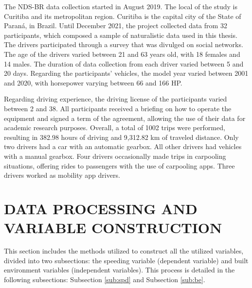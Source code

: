 The NDS-BR data collection started in August 2019. The local of the study is Curitiba and its metropolitan region. Curitiba is the capital city of the State of Paraná, in Brazil. Until December 2021, the project collected data from 32 participants, which composed a sample of naturalistic data used in this thesis. The drivers participated through a survey that was divulged on social networks. The age of the drivers varied between 21 and 63 years old, with 18 females and 14 males. The duration of data collection from each driver varied between 5 and 20 days. Regarding the participants' vehicles, the model year varied between 2001 and 2020, with horsepower varying between 66 and 166 HP. 

Regarding driving experience, the driving license of the participants varied between 2 and 38. All participants received a briefing on how to operate the equipment and signed a term of the agreement, allowing the use of their data for academic research purposes. Overall, a total of 1002 trips were performed, resulting in 382.98 hours of driving and 9,312.82 km of traveled distance. Only two drivers had a car with an automatic gearbox. All other drivers had vehicles with a manual gearbox. Four drivers occasionally made trips in carpooling situations, offering rides to passengers with the use of carpooling apps. Three drivers worked as mobility app drivers.


\section{DATA PROCESSING AND VARIABLE CONSTRUCTION} \label{data}


This section includes the methods utilized to construct all the utilized variables, divided into two subsections: the speeding variable (dependent variable) and built environment variables (independent variables). This process is detailed in the following subsections: Subsection \ref{sub:spd} and Subsection \ref{sub:be}.


